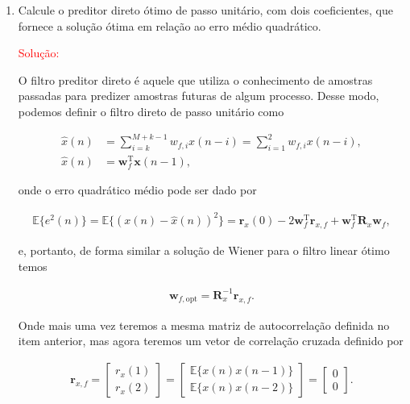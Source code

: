 \documentclass[a4paper,10pt]{article}
\begin{document}
\begin{enumerate}
\begin{enumerate}
					\item Calcule o preditor direto ótimo de passo unitário, com dois coeficientes, que fornece a solução ótima em relação ao erro médio quadrático.
					
						\textcolor{red}{Solução:}
						
						O filtro preditor direto é aquele que utiliza o conhecimento de amostras passadas para predizer amostras futuras de algum processo. Desse modo, podemos definir o filtro direto de passo unitário como

						\begin{align}
							\hat{x}(n) &= \sum^{M + k - 1}_{i = k} w_{f,i} x(n - i) = \sum^{2}_{i = 1} w_{f,i} x(n - i), \\
							\hat{x}(n) &= \mathbf{w}^{\text{T}}_{f} \mathbf{x}(n - 1),
						\end{align}

						onde o erro quadrático médio pode ser dado por

						\begin{align}
							\mathbb{E}\{e^{2}(n)\} = \mathbb{E}\{(x(n) - \hat{x}(n) )^{2}\} = \mathbf{r}_{x}(0) - 2 \mathbf{w}^{\text{T}}_{f} \mathbf{r}_{x,f} + \mathbf{w}^{\text{T}}_{f} \mathbf{R}_{x} \mathbf{w}_{f},
						\end{align}

						e, portanto, de forma similar a solução de Wiener para o filtro linear ótimo temos

						\begin{align}
							\mathbf{w}_{f,\text{opt}} = \mathbf{R}^{-1}_{x} \mathbf{r}_{x,f}.
						\end{align}

						Onde mais uma vez teremos a mesma matriz de autocorrelação definida no item anterior, mas agora teremos um vetor de correlação cruzada definido por

						\begin{align}
							\mathbf{r}_{x,f} = 
							\begin{bmatrix}
								r_{x}(1) \\
								r_{x}(2)
							\end{bmatrix} =
							\begin{bmatrix}
								\mathbb{E}\{x(n) x(n - 1)\} \\
								\mathbb{E}\{x(n) x(n - 2)\}
							\end{bmatrix} = 
							\begin{bmatrix}
								0 \\
								0
							\end{bmatrix}.
						\end{align}
						

\end{enumerate}
\end{enumerate}
\end{document}
